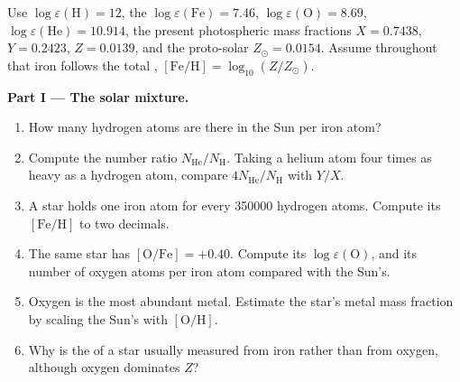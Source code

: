 \begin{problem}
\label{pb:b3:origin-of-elements:1}
Use $\log\varepsilon(\mathrm{H}) = 12$, the 
$\log\varepsilon(\mathrm{Fe}) = 7.46$, $\log\varepsilon(\mathrm{O}) =
8.69$, $\log\varepsilon(\mathrm{He}) = 10.914$, the present
photospheric mass fractions $X = 0.7438$, $Y = 0.2423$, $Z = 0.0139$,
and the proto-solar $Z_\odot = 0.0154$. Assume throughout that iron
follows the total , $[\mathrm{Fe/H}] = \log_{10}(Z/Z_\odot)$.

\medskip\noindent\textbf{Part I --- The solar mixture.}
\begin{enumerate}
\item How many hydrogen atoms are there in the Sun per iron atom?
\item Compute the number ratio $N_\mathrm{He}/N_\mathrm{H}$. Taking a
  helium atom four times as heavy as a hydrogen atom, compare
  $4N_\mathrm{He}/N_\mathrm{H}$ with $Y/X$.
\item A star holds one iron atom for every \num{350000} hydrogen atoms.
  Compute its $[\mathrm{Fe/H}]$ to two decimals.
\item The same star has $[\mathrm{O/Fe}] = +0.40$. Compute its
  $\log\varepsilon(\mathrm{O})$, and its number of oxygen atoms per iron
  atom compared with the Sun's.
\item Oxygen is the most abundant metal. Estimate the star's metal mass
  fraction by scaling the Sun's with $[\mathrm{O/H}]$.
\item Why is the  of a star usually measured from iron
  rather than from oxygen, although oxygen dominates $Z$?
\end{enumerate}


\end{problem}
